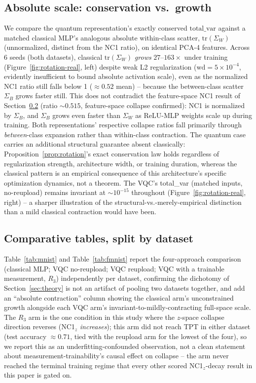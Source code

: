 \documentclass[pdflatex,sn-mathphys-ay]{sn-jnl}
\theoremstyle{thmstyleone}
\theoremstyle{thmstyletwo}
\begin{document}
\subsection{Absolute scale: conservation vs.\ growth}
\label{sec:w2}

We compare the quantum representation's exactly conserved $\mathrm{total\_var}$ against a matched classical MLP's analogous absolute within-class scatter, $\mathrm{tr}(\Sigma_W)$ (unnormalized, distinct from the NC1 ratio), on identical PCA-4 features. Across 6 seeds (both datasets), classical $\mathrm{tr}(\Sigma_W)$ \emph{grows} $27$--$163\times$ under training (Figure~\ref{fig:rotation-real}, left) despite weak L2 regularization ($\mathrm{wd}=5\times10^{-4}$, evidently insufficient to bound absolute activation scale), even as the normalized NC1 ratio still falls below 1 ($\approx0.52$ mean) -- because the between-class scatter $\Sigma_B$ grows faster still. This does not contradict the feature-space NC1 result of Section~\ref{sec:comp-tables} (ratio $\sim0.515$, feature-space collapse confirmed): NC1 is normalized by $\Sigma_B$, and $\Sigma_B$ grows even faster than $\Sigma_W$ as ReLU-MLP weights scale up during training. Both representations' respective collapse ratios fall primarily through \emph{between}-class expansion rather than within-class contraction. The quantum case carries an additional structural guarantee absent classically: Proposition~\ref{prop:rotation}'s exact conservation law holds regardless of regularization strength, architecture width, or training duration, whereas the classical pattern is an empirical consequence of this architecture's specific optimization dynamics, not a theorem. The VQC's total\_var (matched inputs, no-reupload) remains invariant at $\sim10^{-15}$ throughout (Figure~\ref{fig:rotation-real}, right) -- a sharper illustration of the structural-vs.-merely-empirical distinction than a mild classical contraction would have been.

\subsection{Comparative tables, split by dataset}
\label{sec:comp-tables}

Table~\ref{tab:mnist} and Table~\ref{tab:fmnist} report the four-approach comparison (classical MLP; VQC no-reupload; VQC reupload; VQC with a trainable measurement, $R_3$) independently per dataset, confirming the dichotomy of Section~\ref{sec:theory} is not an artifact of pooling two datasets together, and add an ``absolute contraction'' column showing the classical arm's unconstrained growth alongside each VQC arm's invariant-to-mildly-contracting full-space scale. The $R_3$ arm is the one condition in this study where the $z$-space collapse direction reverses (NC1$_z$ \emph{increases}); this arm did not reach TPT in either dataset (test accuracy $\approx0.71$, tied with the reupload arm for the lowest of the four), so we report this as an underfitting-confounded observation, not a clean statement about measurement-trainability's causal effect on collapse -- the arm never reached the terminal training regime that every other scored NC1$_z$-decay result in this paper is gated on.
\end{document}

